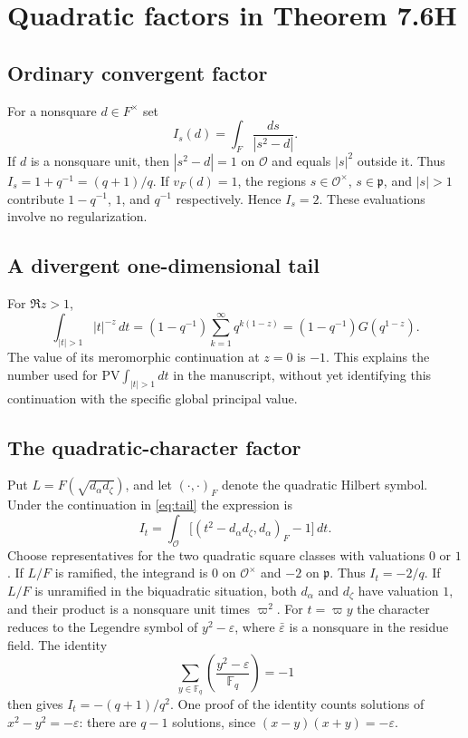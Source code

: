\documentclass[12pt,letterpaper]{amsart}
\begin{document}
\section{Quadratic factors in Theorem 7.6H}
\subsection*{Ordinary convergent factor}
For a nonsquare $d\in F^\times$ set
\begin{equation}\label{eq:Is}
I_s(d)=\int_F\frac{ds}{|s^2-d|}.
\end{equation}
If $d$ is a nonsquare unit, then $|s^2-d|=1$ on $\mathcal O$ and equals $|s|^2$ outside it. Thus $I_s=1+q^{-1}=(q+1)/q$. If $v_F(d)=1$, the regions $s\in\mathcal O^\times$, $s\in\mathfrak p$, and $|s|>1$ contribute $1-q^{-1}$, $1$, and $q^{-1}$ respectively. Hence $I_s=2$. These evaluations involve no regularization.

\subsection*{A divergent one-dimensional tail}
For $\Re z>1$,
\begin{equation}\label{eq:tail}
\int_{|t|>1}|t|^{-z}\,dt
=(1-q^{-1})\sum_{k=1}^{\infty}q^{k(1-z)}
=(1-q^{-1})G(q^{1-z}).
\end{equation}
The value of its meromorphic continuation at $z=0$ is $-1$. This explains the number used for $\mathrm{PV}\int_{|t|>1}dt$ in the manuscript, without yet identifying this continuation with the specific global principal value.

\subsection*{The quadratic-character factor}
Put $L=F(\sqrt{d_\alpha d_\zeta})$, and let $(\cdot,\cdot)_F$ denote the quadratic Hilbert symbol. Under the continuation in \eqref{eq:tail} the expression is
\begin{equation}\label{eq:It}
I_t=\int_{\mathcal O}\bigl[(t^2-d_\alpha d_\zeta,d_\alpha)_F-1\bigr]\,dt.
\end{equation}
Choose representatives for the two quadratic square classes with valuations $0$ or $1$. If $L/F$ is ramified, the integrand is $0$ on $\mathcal O^\times$ and $-2$ on $\mathfrak p$. Thus $I_t=-2/q$. If $L/F$ is unramified in the biquadratic situation, both $d_\alpha$ and $d_\zeta$ have valuation $1$, and their product is a nonsquare unit times $\varpi^2$. For $t=\varpi y$ the character reduces to the Legendre symbol of $y^2-\varepsilon$, where $\bar\varepsilon$ is a nonsquare in the residue field. The identity
\[
\sum_{y\in\mathbb F_q}\left(\frac{y^2-\varepsilon}{\mathbb F_q}\right)=-1
\]
then gives $I_t=-(q+1)/q^2$. One proof of the identity counts solutions of $x^2-y^2=-\varepsilon$: there are $q-1$ solutions, since $(x-y)(x+y)=-\varepsilon$.
\end{document}
